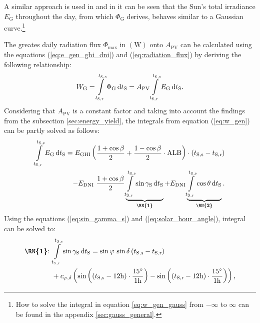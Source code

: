 A similar approach is used in \cite{Guo:2017, Nguyen:2020} and in \cite{Balafas:2010, Mertens:2015, Koudouris:2017} it can be seen that the Sun's total irradiance $E_{\mathrm{G}}$ throughout the day, from which $\Phi_{\mathrm{G}}$ derives, behaves similar to a Gaussian curve.\footnote{How to solve the integral in equation \ref{eq:w_gen_gauss} from $-\infty$ to $\infty$ can be found in the appendix \ref{sec:gauss_general}.}

The greates daily radiation flux $\Phi_{\mathrm{max}}$ in $\left(\mathrm W\right)$ onto $A_{\mathrm{PV}}$ can be calculated using the equations (\ref{eq:e_gen_ghi_dni}) and (\ref{eq:radiation_flux}) by deriving the following relationship:
	\begin{equation} \label{eq:w_gen}
	\centering
		W_\mathrm{G} = \int\limits_{t_{\mathrm{S,r}}}^{t_{\mathrm{S,s}}} \Phi_{\mathrm{G}}\,\mathrm{d}t_\mathrm{S} = A_{\mathrm{PV}} \int\limits_{t_{\mathrm{S,r}}}^{t_{\mathrm{S,s}}} E_{\mathrm{G}}\,\mathrm{d}t_\mathrm{S} \text{.}
	\end{equation}
Considering that $A_{\mathrm{PV}}$ is a constant factor and taking into account the findings from the subsection \ref{sec:energy_yield}, the integrals from equation (\ref{eq:w_gen}) can be partly solved as follows:
	\begin{equation} \label{eq:int_e_gen}
	\centering
		\begin{split}
		\int\limits_{t_{\mathrm{S,r}}}^{t_{\mathrm{S,s}}} E_{\mathrm{G}}\,\mathrm{d}t_\mathrm{S} = E_{\mathrm{GHI}} \left( \frac{1 + \cos \beta}{2} + \frac{1 - \cos \beta}{2} \cdot \mathrm{ALB} \right) \cdot \left(t_{\mathrm{S,s}} - t_{\mathrm{S,r}}\right) \\ 
		- E_{\mathrm{DNI}} \ \frac{1 + \cos \beta}{2} \underbrace{\int\limits_{t_{\mathrm{S,r}}}^{t_{\mathrm{S,s}}} \sin \gamma_{\mathrm{S}}\,\mathrm{d}t_\mathrm{S}}_\text{\textbf{\RN{1}}} + E_{\mathrm{DNI}} \underbrace{\int\limits_{t_{\mathrm{S,r}}}^{t_{\mathrm{S,s}}} \cos \theta \,\mathrm{d}t_\mathrm{S}}_\text{\textbf{\RN{2}}} \text{.}
		\end{split}
	\end{equation}
Using the equations (\ref{eq:sin_gamma_s}) and (\ref{eq:solar_hour_angle}), integral  can be solved to:
	\begin{equation} \label{eq:int_rn_1}
	\centering
		\begin{aligned}
		\text{\textbf{\RN{1}}:} \ &\int\limits_{t_{\mathrm{S,r}}}^{t_{\mathrm{S,s}}} \sin \gamma_{\mathrm{S}}\,\mathrm{d}t_\mathrm{S} = 
		\sin \varphi \, \sin \delta \left(t_{\mathrm{S,s}} - t_{\mathrm{S,r}} \right) \\
		&+ c_{\varphi,\delta} \left(\sin \left(\left(t_{\mathrm{S,s}} - 12\mathrm{h} \right) \cdot \frac{15^\circ}{1\mathrm{h}} \right) - \sin \left(\left( t_{\mathrm{S,r}} - 12\mathrm{h} \right) \cdot \frac{15^\circ}{1\mathrm{h}} \right)\right) \text{,}
		\end{aligned}
	\end{equation}
